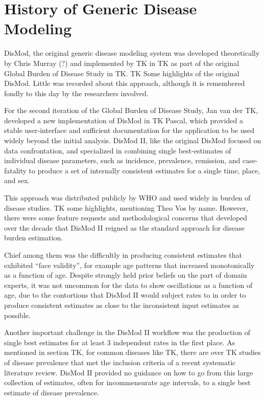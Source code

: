 \section{History of Generic Disease Modeling}

DisMod, the original generic disease modeling system was developed
theoretically by Chris Murray (?) and implemented by TK in TK as part
of the original Global Burden of Disease Study in TK. TK Some
highlights of the original DisMod. Little was recorded about this
approach, although it is remembered fondly to this day by the
researchers involved.

For the second iteration of the Global Burden of Disease Study, Jan
van der TK, developed a new implementation of DisMod in TK Pascal,
which provided a stable user-interface and sufficient documentation
for the application to be used widely beyond the initial analysis.
DisMod II, like the original DisMod focused on data confrontation, and
specialized in combining single best-estimates of individual disease
parameters, such as incidence, prevalence, remission, and
case-fatality to produce a set of internally consistent estimates for
a single time, place, and sex.

This approach was distributed publicly by WHO and used widely in
burden of disease studies. TK some highlights, mentioning Theo Vos by
name. However, there were some feature requests and methodological
concerns that developed over the decade that DisMod II reigned as the
standard approach for disease burden estimation.

Chief among them was the difficultly in producing consistent estimates
that exhibited ``face validity'', for example age patterns that
increased monotonically as a function of age.  Despite strongly held
prior beliefs on the part of domain experts, it was not uncommon for
the data to show oscillations as a function of age, due to the
contortions that DisMod II would subject rates to in order to produce
consistent estimates as close to the inconsistent input estimates as
possible.

Another important challenge in the DisMod II workflow was the
production of single best estimates for at least 3 independent rates
in the first place.  As mentioned in section TK, for common diseases
like TK, there are over TK studies of disease prevalence that met the
inclusion criteria of a recent systematic literature review. DisMod II
provided no guidance on how to go from this large collection of
estimates, often for incommensurate age intervals, to a single best
estimate of disease prevalence.

